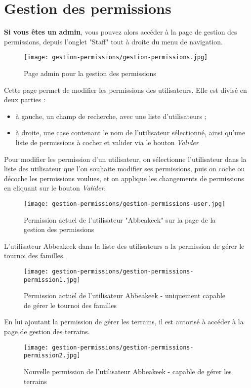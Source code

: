 \section{Gestion des permissions}

\textbf{Si vous êtes un admin}, vous pouvez alors accéder à la page de gestion des permissions, depuis l'onglet "Staff" tout à droite du menu de navigation.

\begin{figure}[H]
\centering
\texttt{[image: gestion-permissions/gestion-permissions.jpg]}
\caption{Page admin pour la gestion des permissions}
\end{figure}

Cette page permet de modifier les permissions des utilisateurs. Elle est divisé en deux parties :

\begin{itemize}
\item  à gauche, un champ de recherche, avec une liste d'utilisateurs ;
\item à droite, une case contenant le nom de l'utilisateur sélectionné, ainsi qu'une liste de permissions à cocher et valider via le bouton \textit{Valider}
\end{itemize}
\bigskip

Pour modifier les permission d'un utilisateur, on sélectionne l'utilisateur dans la liste des utilisateur que l'on souhaite modifier ses permissions, puis on coche ou décoche les permissions voulues, et on applique les changements de permissions en cliquant sur le bouton \textit{Valider}.\newline

\begin{figure}[H]
\centering
\texttt{[image: gestion-permissions/gestion-permissions-user.jpg]}
\caption{Permission actuel de l'utilisateur "Abbeakeek" sur la page de la gestion des permissions}
\end{figure}

L'utilisateur Abbeakeek dans la liste des utilisateurs a la permission de gérer le tournoi des familles.

\begin{figure}[H]
\centering
\texttt{[image: gestion-permissions/gestion-permissions-permission1.jpg]}
\caption{Permission actuel de l'utilisateur Abbeakeek - uniquement capable de gérer le tournoi des familles}
\end{figure}

En lui ajoutant la permission de gérer les terrains, il est autorisé à accéder à la page de gestion des terrains.

\begin{figure}[H]
\centering
\texttt{[image: gestion-permissions/gestion-permissions-permission2.jpg]}
\caption{Nouvelle permission de l'utilisateur Abbeakeek - capable de gérer les terrains}
\end{figure}
